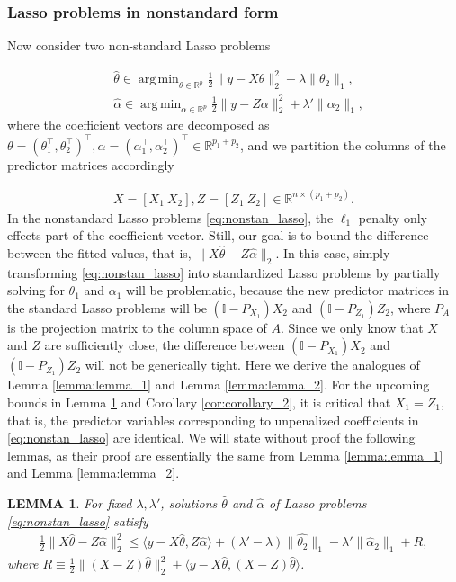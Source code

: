 \documentclass[a4paper]{article}
\DeclareMathOperator*{\argmin}{arg\,min}
\newtheorem{lemma}{LEMMA}
\newcommand{\RR}{\mathbb{R}}
\newcommand{\ra}{\rangle}
\newcommand{\la}{\langle}
\begin{document}
\subsubsection{Lasso problems in nonstandard form}

Now consider two non-standard Lasso problems

\begin{equation}
\begin{aligned}
&\hat{\theta} \in \argmin_{\theta\in\RR^p}\frac{1}{2}\|y-X\theta\|_2^2 + \lambda\|\theta_2\|_1,\\
&\hat{\alpha} \in \argmin_{\alpha\in\RR^p} \frac{1}{2}\|y-Z\alpha\|_2^2 + \lambda'\|\alpha_2\|_1,
\end{aligned}
\label{eq:nonstan_lasso}
\end{equation}
where the coefficient vectors are decomposed as $\theta = (\theta_1^\top ,\theta_2^\top)^\top, \alpha = (\alpha_1^\top, \alpha_2^\top)^\top \in \RR^{p_1+p_2}$, and we partition the columns of the predictor matrices accordingly 

\begin{align*}
X = [X_1 ~ X_2], Z = [Z_1 ~ Z_2] \in \RR^{n\times (p_1+p_2)}.
\end{align*}
In the nonstandard Lasso problems \eqref{eq:nonstan_lasso}, the $\ell_1$ penalty only effects part of the coefficient vector. Still, our goal is to bound the difference between the fitted values, that is, $\|X\hat{\theta} - Z\hat{\alpha}\|_2$. In this case, simply transforming \eqref{eq:nonstan_lasso} into standardized Lasso problems by partially solving for $\theta_1$ and $\alpha_1$ will be problematic, because the new predictor matrices in the standard Lasso problems will be $(\mathbb{I}-P_{X_1})X_2$ and $(\mathbb{I}-P_{Z_1})Z_2$, where $P_A$ is the projection matrix to the column space of $A$. Since we only know that $X$ and $Z$ are sufficiently close, the difference between $(\mathbb{I}-P_{X_1})X_2$ and $(\mathbb{I}-P_{Z_1})Z_2$ will not be generically tight. Here we derive the analogues of Lemma \ref{lemma:lemma_1} and Lemma \ref{lemma:lemma_2}. For the upcoming bounds in Lemma \ref{lemma:lemma_3} and Corollary \ref{cor:corollary_2}, it is critical that $X_1 = Z_1$, that is, the predictor variables corresponding to unpenalized coefficients in \eqref{eq:nonstan_lasso} are identical. We will state without proof the following lemmas, as their proof are essentially the same from Lemma \ref{lemma:lemma_1} and Lemma \ref{lemma:lemma_2}.

\begin{lemma}
For fixed $\lambda, \lambda'$, solutions $\hat{\theta}$ and $\hat{\alpha}$ of Lasso problems \eqref{eq:nonstan_lasso} satisfy
\begin{align*}
\frac{1}{2}\|X\hat{\theta} - Z\hat{\alpha}\|_2^2 \leq \la y-X\hat{\theta}, Z\hat{\alpha} \ra + (\lambda'-\lambda)\|\hat{\theta_2}\|_1 - \lambda'\|\hat{\alpha}_2\|_1 + R,
\end{align*}
where $R\equiv \frac{1}{2}\|(X-Z)\hat{\theta}\|_2^2 + \la y-X\hat{\theta}, (X-Z)\hat{\theta}\ra$.
\label{lemma:lemma_3}
\end{lemma}
\end{document}
